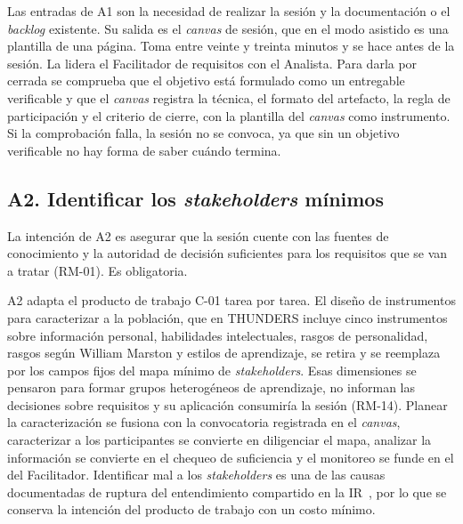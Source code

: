 \documentclass[12pt,letterpaper,oneside]{report}
\begin{document}
Las entradas de A1 son la necesidad de realizar la sesión y la documentación o
el \textit{backlog} existente. Su salida es el \textit{canvas} de sesión, que
en el modo asistido es una plantilla de una página. Toma entre veinte y treinta
minutos y se hace antes de la sesión. La lidera el Facilitador de requisitos
con el Analista. Para darla por cerrada se comprueba que el objetivo está
formulado como un entregable verificable y que el \textit{canvas} registra la
técnica, el formato del artefacto, la regla de participación y el criterio de
cierre, con la plantilla del \textit{canvas} como instrumento. Si la
comprobación falla, la sesión no se convoca, ya que sin un objetivo verificable
no hay forma de saber cuándo termina.

\subsection{A2. Identificar los \textit{stakeholders} mínimos}
La intención de A2 es asegurar que la sesión cuente con las fuentes de
conocimiento y la autoridad de decisión suficientes para los requisitos que se
van a tratar (RM-01). Es obligatoria.

A2 adapta el producto de trabajo C-01 tarea por tarea. El diseño de instrumentos para
caracterizar a la población, que en THUNDERS incluye cinco instrumentos sobre
información personal, habilidades intelectuales, rasgos de personalidad, rasgos
según William Marston y estilos de aprendizaje, se retira y se reemplaza por los
campos fijos del mapa mínimo de \textit{stakeholders}. Esas dimensiones se
pensaron para formar grupos heterogéneos de aprendizaje, no informan las
decisiones sobre requisitos y su aplicación consumiría la sesión (RM-14).
Planear la caracterización se fusiona con la convocatoria registrada en el
\textit{canvas}, caracterizar a los participantes se convierte en diligenciar el
mapa, analizar la información se convierte en el chequeo de suficiencia y el
monitoreo se funde en el del Facilitador. Identificar mal a los
\textit{stakeholders} es una de las causas documentadas de ruptura del
entendimiento compartido en la IR~\cite{khan2022stakeholders}, por lo que se conserva la
intención del producto de trabajo con un costo mínimo.
\end{document}
